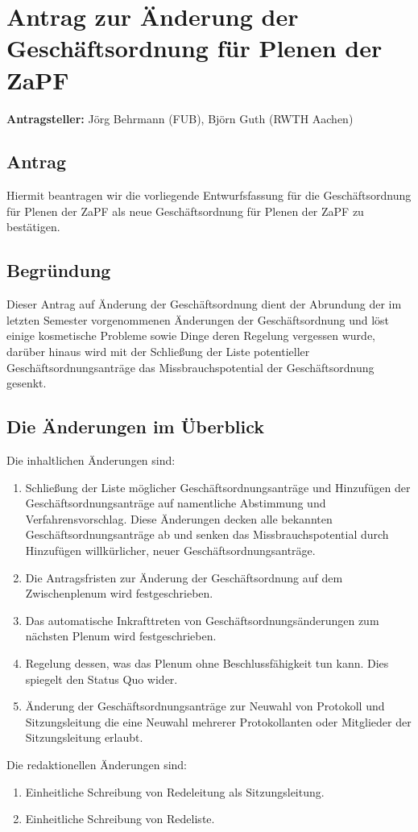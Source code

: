 \documentclass[draft,12pt,oneside]{scrartcl}
\begin{document}
\section*{Antrag zur Änderung der Geschäftsordnung für Plenen der ZaPF}

\textbf{Antragsteller:} Jörg Behrmann (FUB), Björn Guth (RWTH Aachen)

\subsection*{Antrag}

Hiermit beantragen wir die vorliegende Entwurfsfassung für die Geschäftsordnung für Plenen der ZaPF als neue
Geschäftsordnung für Plenen der ZaPF zu bestätigen.

\subsection*{Begründung}

Dieser Antrag auf Änderung der Geschäftsordnung dient der Abrundung der im
letzten Semester vorgenommenen Änderungen der Geschäftsordnung und löst einige
kosmetische Probleme sowie Dinge deren Regelung vergessen wurde, darüber hinaus
wird mit der Schließung der Liste potentieller Geschäftsordnungsanträge das
Missbrauchspotential der Geschäftsordnung gesenkt.

\subsection*{Die Änderungen im Überblick}

Die inhaltlichen Änderungen sind:
\begin{enumerate}
\item Schließung der Liste möglicher Geschäftsordnungsanträge und Hinzufügen der
  Geschäftsordnungsanträge auf namentliche Abstimmung und
  Verfahrensvorschlag.
  Diese Änderungen decken alle bekannten Geschäftsordnungsanträge ab und
  senken das Missbrauchspotential durch Hinzufügen willkürlicher, neuer
  Geschäftsordnungsanträge.
\item Die Antragsfristen zur Änderung der Geschäftsordnung auf dem
  Zwischenplenum wird festgeschrieben.
\item Das automatische Inkrafttreten von Geschäftsordnungsänderungen zum
  nächsten Plenum wird festgeschrieben.
\item Regelung dessen, was das Plenum ohne Beschlussfähigkeit tun kann. Dies
  spiegelt den Status Quo wider.
\item Änderung der Geschäftsordnungsanträge zur Neuwahl von Protokoll und
  Sitzungsleitung die eine Neuwahl mehrerer Protokollanten oder Mitglieder der
  Sitzungsleitung erlaubt.
\end{enumerate}

Die redaktionellen Änderungen sind:
\begin{enumerate}
\item Einheitliche Schreibung von Redeleitung als Sitzungsleitung.
\item Einheitliche Schreibung von Redeliste.
\end{enumerate}
\end{document}
